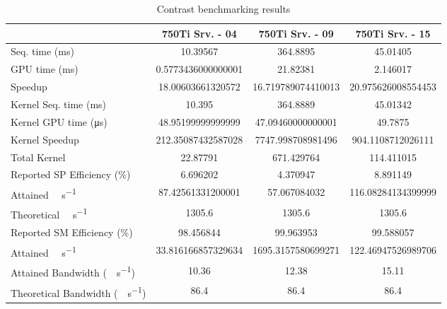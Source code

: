 \begin{table}[H]
	\centering
	\caption{Contrast benchmarking results}
	\label{tab:contrast-results}
	\begin{tabular}{lS[table-format=7.1]S[table-format=7.1]S[table-format=7.1]}
		\toprule
			~ & {\textbf{750Ti Srv. - 04}} & {\textbf{750Ti Srv. - 09}} & {\textbf{750Ti Srv. - 15}} \\
		\midrule
			{Seq. time (\si{\milli\second})} & 10.39567 & 364.8895 & 45.01405 \\
			{GPU time (\si{\milli\second})} & 0.5773436000000001 & 21.82381 & 2.146017 \\
			{Speedup} & 18.00603661320572 &16.719789074410013 & 20.975626008554453 \\
		\midrule
			{Kernel Seq. time (\si{\milli\second})} & 10.395 & 364.8889 & 45.01342 \\
			{Kernel GPU time (\si{\micro\second})} & 48.95199999999999 & 47.09460000000001 & 49.7875 \\
			{Kernel Speedup} & 212.35087432587028 & 7747.998708981496 & 904.1108712026111 \\
		\midrule
			{Total Kernel \si{\mega\flops}} & 22.87791 & 671.429764 & 114.411015 \\
			{Reported SP Efficiency (\si{\percent})} & 6.696202 & 4.370947 & 8.891149 \\
			{Attained \si{\giga\flops\per\second}} & 87.42561331200001 & 57.067084032 & 116.08284134399999 \\
			{Theoretical \si{\giga\flops\per\second}} & 1305.6 & 1305.6 & 1305.6 \\
		\midrule
			{Reported SM Efficiency (\si{\percent})} & 98.456844 & 99.963953 & 99.588057 \\
			{Attained \si{\giga\iops\per\second}} & 33.816166857329634 & 1695.3157580699271 & 122.46947526989706 \\			
		\midrule
			{Attained Bandwidth (\si{\giga\byte\per\second})} & 10.36 & 12.38  & 15.11 \\
			{Theoretical Bandwidth (\si{\giga\byte\per\second})}	& 86.4 & 86.4 & 86.4 \\
		\bottomrule
	\end{tabular}
\end{table}